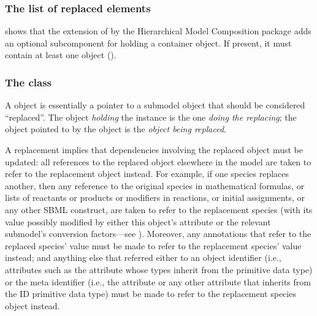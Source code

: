 
\subsubsection{The list of replaced elements}

 shows that the extension of \SBase by the Hierarchical Model Composition package adds an optional  subcomponent for holding a \ListOfReplacedElements container object.  If present, it must contain at least one \ReplacedElement object ().


\subsubsection{The  class}
\label{replacedelement-class}
\label{listofreplacedelements-class}

A \ReplacedElement object is essentially a pointer to a submodel object that should be considered ``replaced''.  The object \emph{holding} the \ReplacedElement instance is the one \emph{doing the replacing}; the object pointed to by the \ReplacedElement object is the \emph{object   being replaced}.

A replacement implies that dependencies involving the replaced object must be updated: all references to the replaced object elsewhere in the model are taken to refer to the replacement object instead.  For example, if one species replaces another, then any reference to the original species in mathematical formulas, or lists of reactants or products or modifiers in reactions, or initial assignments, or any other SBML construct, are taken to refer to the replacement species (with its value possibly modified by either this object's  attribute or the relevant submodel's conversion factors---see ). Moreover, any annotations that refer to the replaced species'  value must be made to refer to the replacement species'  value instead; and anything else that referred either to an object identifier (i.e., attributes such as the  attribute whose types inherit from the  primitive data type) or the meta identifier (i.e., the  attribute or any other attribute that inherits from the ID primitive data type) must be made to refer to the replacement species object instead.

